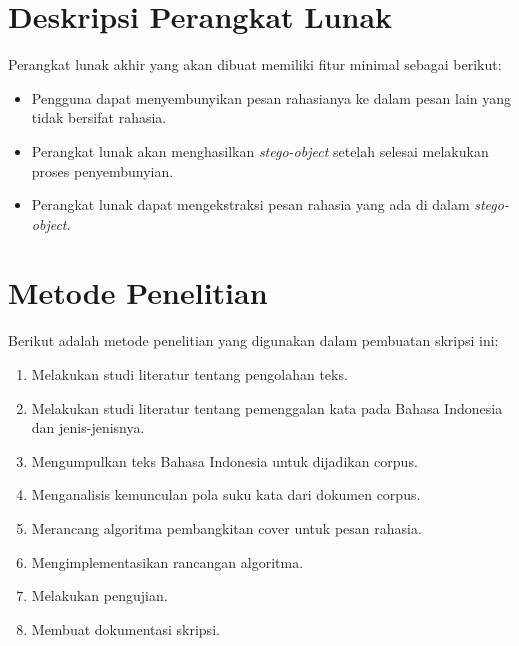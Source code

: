 \section{Deskripsi Perangkat Lunak}
\label{sec:Deskripsi Perangkat Lunak}
Perangkat lunak akhir yang akan dibuat memiliki fitur minimal sebagai berikut:
\begin{itemize}
	\item Pengguna dapat menyembunyikan pesan rahasianya ke dalam pesan lain yang tidak bersifat rahasia.
	\item Perangkat lunak akan menghasilkan \textit{stego-object} setelah selesai melakukan proses penyembunyian.
	\item Perangkat lunak dapat mengekstraksi pesan rahasia yang ada di dalam \textit{stego-object}.
\end{itemize}

\section{Metode Penelitian}
\label{sec:metodePenelitian}
Berikut adalah metode penelitian yang digunakan dalam pembuatan skripsi ini:
	\begin{enumerate}
		\item Melakukan studi literatur tentang pengolahan teks.
		\item Melakukan studi literatur tentang pemenggalan kata pada Bahasa Indonesia dan jenis-jenisnya.
		\item Mengumpulkan teks Bahasa Indonesia untuk dijadikan corpus.
		\item Menganalisis kemunculan pola suku kata dari dokumen corpus.
		\item Merancang algoritma pembangkitan cover untuk pesan rahasia.
		\item Mengimplementasikan rancangan algoritma.
		\item Melakukan pengujian.
		\item Membuat dokumentasi skripsi.
	\end{enumerate}